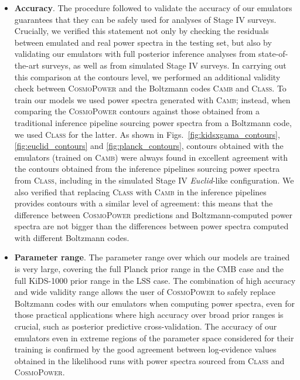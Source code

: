 \documentclass[fleqn,usenatbib]{mnras}
\begin{document}
\begin{itemize}
\item \textbf{Accuracy}. The procedure followed to validate the accuracy of our emulators guarantees that they can be safely used for analyses of Stage IV surveys. Crucially, we verified this statement not only by checking the residuals between emulated and real power spectra in the testing set, but also by validating our emulators with full posterior inference analyses from state-of-the-art surveys, as well as from simulated Stage IV surveys. In carrying out this comparison at the contours level, we performed an additional validity check between \textsc{CosmoPower} and the Boltzmann codes \textsc{Camb} and \textsc{Class}. To train our models we used power spectra generated with \textsc{Camb}; instead, when comparing the \textsc{CosmoPower} contours against those obtained from a traditional inference pipeline sourcing power spectra from a Boltzmann code, we used \textsc{Class} for the latter. As shown in Figs.~\ref{fig:kidsxgama_contours}, \ref{fig:euclid_contours} and \ref{fig:planck_contours}, contours obtained with the emulators (trained on \textsc{Camb}) were always found in excellent agreement with the contours obtained from the inference pipelines sourcing power spectra from \textsc{Class}, including in the simulated Stage IV \textit{Euclid}-like configuration. We also verified that replacing \textsc{Class} with \textsc{Camb} in the inference pipelines provides contours with a similar level of agreement: this means that the difference between \textsc{CosmoPower} predictions and Boltzmann-computed power spectra are not bigger than the differences between power spectra computed with different Boltzmann codes.

\smallskip

\item \textbf{Parameter range}. The parameter range over which our models are trained is very large, covering the full Planck prior range in the CMB case and the full KiDS-1000 prior range in the LSS case. The combination of high accuracy and wide validity range allows the user of \textsc{CosmoPower} to safely replace Boltzmann codes with our emulators when computing power spectra, even for those practical applications where high accuracy over broad prior ranges is crucial, such as posterior predictive cross-validation. The accuracy of our emulators even in extreme regions of the parameter space considered for their training is confirmed by the good agreement between log-evidence values obtained in the likelihood runs with power spectra sourced from \textsc{Class} and \textsc{CosmoPower}.


\end{itemize}
\end{document}
